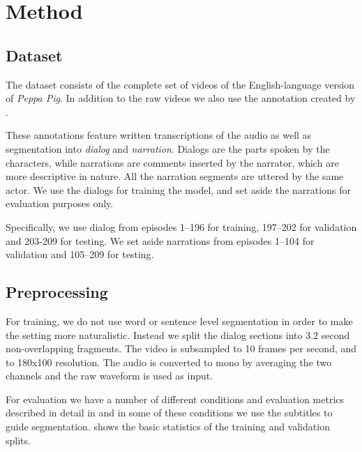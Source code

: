 \section{Method}
\label{sec:method}

\subsection{Dataset}
The dataset consists of the complete set of videos of the
English-language version of {\it Peppa Pig}. In addition to the raw
videos we  also use the annotation created by
\citep{papasarantopoulos2021narration}.

These annotations feature written transcriptions of the audio as well
as segmentation into {\it dialog} and {\it narration}. Dialogs are the
parts spoken by the characters, while narrations are comments inserted
by the narrator, which are more descriptive in nature. All the narration
segments are uttered by the same actor. We use the dialogs for
training the model, and set aside the narrations for evaluation
purposes only.

Specifically, we use dialog from episodes 1--196 for training,
197--202 for validation and 203-209 for testing. We set aside
narrations from episodes 1--104 for validation and 105--209 for
testing. 


\subsection{Preprocessing}
For training, we do not use word or sentence level segmentation in
order to make the setting more naturalistic. Instead we split the
dialog sections into 3.2 second non-overlapping fragments. The video
is subsampled to 10 frames per second, and to 180x100 resolution. The
audio is converted to mono by averaging the two channels  and the raw
waveform is used as input.


For evaluation we have a number of different conditions and evaluation
metrics described in detail in  and in some of these
conditions we use the subtitles to guide
segmentation.  shows the basic statistics of the
training and validation splits.


